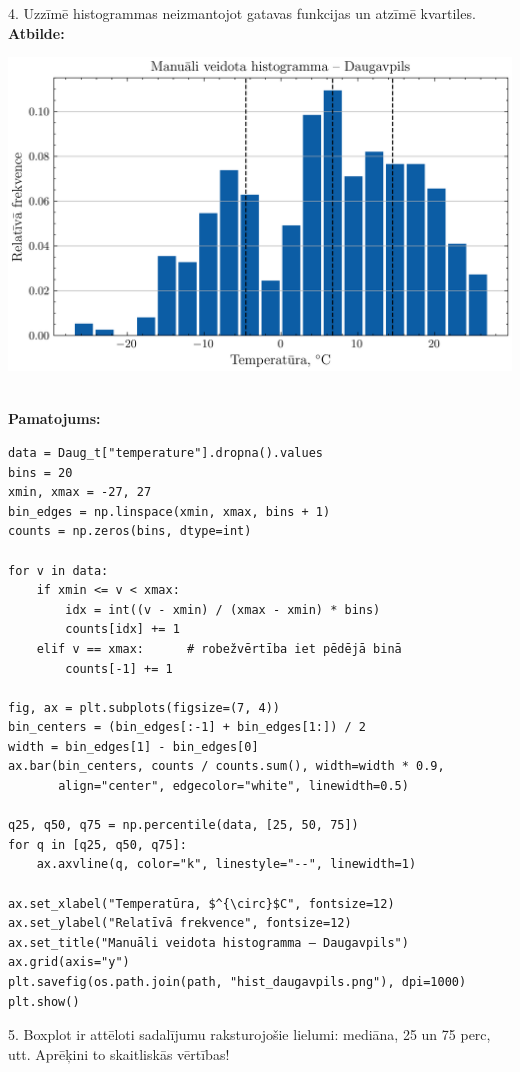 \documentclass[12pt]{article}
\begin{document}
4. Uzzīmē histogrammas neizmantojot gatavas funkcijas un atzīmē kvartiles.\\

\textbf{Atbilde:}
\begin{center}
    \includegraphics[]{hist_daugavpils.png}
\end{center}\\

\textbf{Pamatojums:}
\begin{verbatim}
data = Daug_t["temperature"].dropna().values
bins = 20
xmin, xmax = -27, 27
bin_edges = np.linspace(xmin, xmax, bins + 1)
counts = np.zeros(bins, dtype=int)

for v in data:
    if xmin <= v < xmax:
        idx = int((v - xmin) / (xmax - xmin) * bins)
        counts[idx] += 1
    elif v == xmax:      # robežvērtība iet pēdējā binā
        counts[-1] += 1

fig, ax = plt.subplots(figsize=(7, 4))
bin_centers = (bin_edges[:-1] + bin_edges[1:]) / 2
width = bin_edges[1] - bin_edges[0]
ax.bar(bin_centers, counts / counts.sum(), width=width * 0.9,
       align="center", edgecolor="white", linewidth=0.5)

q25, q50, q75 = np.percentile(data, [25, 50, 75])
for q in [q25, q50, q75]:
    ax.axvline(q, color="k", linestyle="--", linewidth=1)

ax.set_xlabel("Temperatūra, $^{\circ}$C", fontsize=12)
ax.set_ylabel("Relatīvā frekvence", fontsize=12)
ax.set_title("Manuāli veidota histogramma – Daugavpils")
ax.grid(axis="y")
plt.savefig(os.path.join(path, "hist_daugavpils.png"), dpi=1000)
plt.show()
\end{verbatim}

5. Boxplot ir attēloti sadalījumu raksturojošie lielumi: mediāna, 25 un 75 perc, utt. Aprēķini to skaitliskās vērtības!\\
\end{document}
